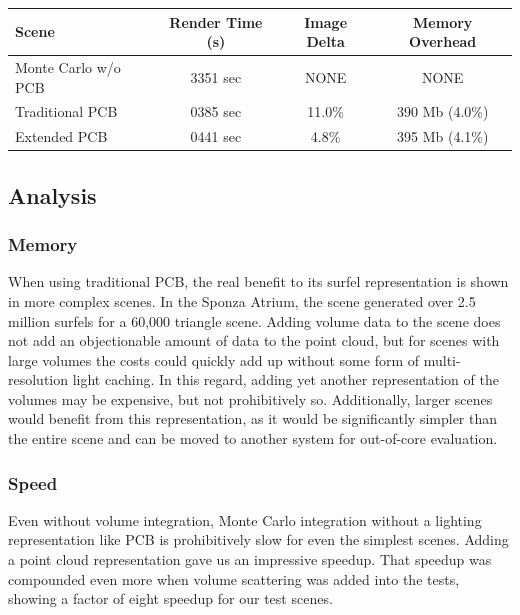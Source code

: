 \documentclass[runningheads]{llncs}
\begin{document}
\begin{center}
\setlength{\tabcolsep}{5pt}
\begin{tabular}{ | l | c | c | c | }
  \hline                       
  Scene & Render Time (s) & Image Delta & Memory Overhead \\
  \hline                  
  Monte Carlo w/o PCB & 3351 sec & NONE & NONE \\
  Traditional PCB & 0385 sec & 11.0\% & 390 Mb (4.0\%) \\
  Extended PCB & 0441 sec & 4.8\% & 395 Mb (4.1\%)  \\
  \hline  
\end{tabular}
\end{center}


\subsection{Analysis}

\subsubsection{Memory}
When using traditional PCB, the real benefit to its surfel representation is shown in more complex scenes.  In the Sponza Atrium, the scene generated over 2.5 million surfels for a 60,000 triangle scene.  Adding volume data to the scene does not add an objectionable amount of data to the point cloud, but for scenes with large volumes the costs could quickly add up without some form of multi-resolution light caching.  In this regard, adding yet another representation of the volumes may be expensive, but not prohibitively so.  Additionally, larger scenes would benefit from this representation, as it would be significantly simpler than the entire scene and can be moved to another system for out-of-core evaluation.

\subsubsection{Speed}
Even without volume integration, Monte Carlo integration without a lighting representation like PCB is prohibitively slow for even the simplest scenes.  Adding a point cloud representation gave us an impressive speedup.  That speedup was compounded even more when volume scattering was added into the tests, showing a factor of eight speedup for our test scenes.
\end{document}

